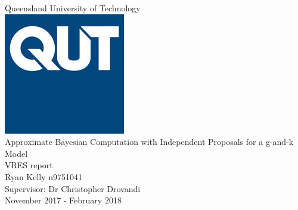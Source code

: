 \documentclass[12,fleqn]{article}
\theoremstyle{definition}
\theoremstyle{plain}
\begin{document}

\begin{titlepage}
\vspace*{5em}
\begin{center}
\Large{Queensland University of Technology}\\[0.5em]
\includegraphics[scale = 0.3]{qut.jpg}\\
\huge{Approximate Bayesian Computation with Independent Proposals for a g-and-k Model }\\[0.2em]
\large{VRES report}\\[2em]
\large{
Ryan Kelly 	n9751041 \\[0.1em]
Supervisor: Dr Christopher Drovandi \\
\vspace{5mm}
November 2017 - February 2018
}
\end{center}
\vspace*{\fill}

\end{titlepage}
\end{document}
